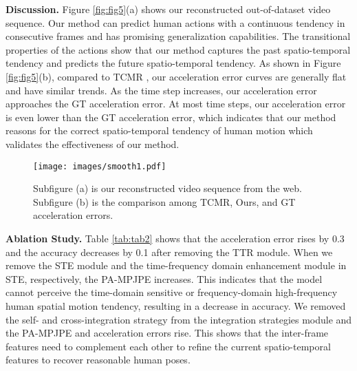 \documentclass{bmvc2k}
\begin{document}
\textbf{Discussion.} Figure \ref{fig:fig5}(a) shows our reconstructed out-of-dataset video sequence. Our method can predict human actions with a continuous tendency in consecutive frames and has promising generalization capabilities. The transitional properties of the actions show that our method captures the past spatio-temporal tendency and predicts the future spatio-temporal tendency. As shown in Figure \ref{fig:fig5}(b), compared to TCMR \cite{choi2021beyond}, our acceleration error curves are generally flat and have similar trends. As the time step increases, our acceleration error approaches the GT acceleration error. At most time steps, our acceleration error is even lower than the GT acceleration error, which indicates that our method reasons for the correct spatio-temporal tendency of human motion which validates the effectiveness of our method.

\begin{figure*}[ht]
\centering
\texttt{[image: images/smooth1.pdf]}
\caption{Subfigure (a) is our reconstructed video sequence from the web. Subfigure (b) is the comparison among TCMR, Ours, and GT acceleration errors.}  \label{fig:fig5}
\label{fig1}
\end{figure*}



























\textbf{Ablation Study.} Table \ref{tab:tab2} shows that the acceleration error rises by 0.3 and the accuracy decreases by 0.1 after removing the TTR module. When we remove the STE module and the time-frequency domain enhancement module in STE, respectively, the PA-MPJPE increases. This indicates that the model cannot perceive the time-domain sensitive or frequency-domain high-frequency human spatial motion tendency, resulting in a decrease in accuracy. We removed the self- and cross-integration strategy from the integration strategies module and the PA-MPJPE and acceleration errors rise. This shows that the inter-frame features need to complement each other to refine the current spatio-temporal features to recover reasonable human poses. 
\end{document}
